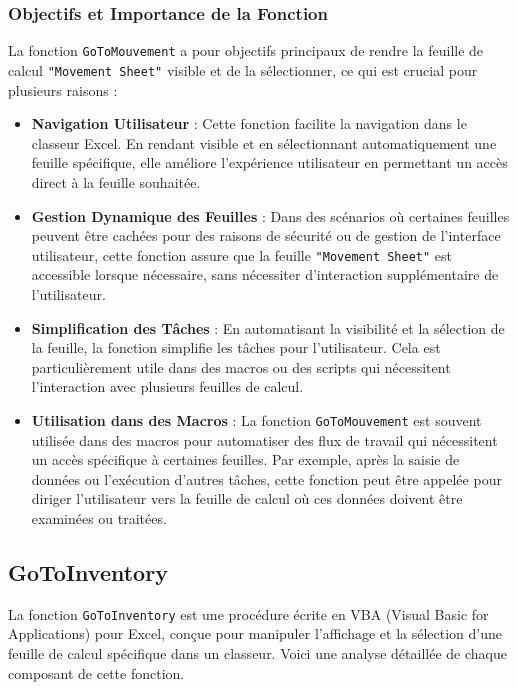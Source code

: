 \documentclass[a4paper, oneside, 12pt, final]{extreport}
\begin{document}
\subsubsection{Objectifs et Importance de la Fonction}

La fonction \texttt{GoToMouvement} a pour objectifs principaux de rendre la feuille de calcul \texttt{"Movement Sheet"} visible et de la sélectionner, ce qui est crucial pour plusieurs raisons :

\begin{itemize}
    \item \textbf{Navigation Utilisateur} : Cette fonction facilite la navigation dans le classeur Excel. En rendant visible et en sélectionnant automatiquement une feuille spécifique, elle améliore l'expérience utilisateur en permettant un accès direct à la feuille souhaitée.
    \item \textbf{Gestion Dynamique des Feuilles} : Dans des scénarios où certaines feuilles peuvent être cachées pour des raisons de sécurité ou de gestion de l'interface utilisateur, cette fonction assure que la feuille \texttt{"Movement Sheet"} est accessible lorsque nécessaire, sans nécessiter d'interaction supplémentaire de l'utilisateur.
    \item \textbf{Simplification des Tâches} : En automatisant la visibilité et la sélection de la feuille, la fonction simplifie les tâches pour l'utilisateur. Cela est particulièrement utile dans des macros ou des scripts qui nécessitent l'interaction avec plusieurs feuilles de calcul.
    \item \textbf{Utilisation dans des Macros} : La fonction \texttt{GoToMouvement} est souvent utilisée dans des macros pour automatiser des flux de travail qui nécessitent un accès spécifique à certaines feuilles. Par exemple, après la saisie de données ou l'exécution d'autres tâches, cette fonction peut être appelée pour diriger l'utilisateur vers la feuille de calcul où ces données doivent être examinées ou traitées.
\end{itemize}
\subsection{GoToInventory}

La fonction \texttt{GoToInventory} est une procédure écrite en VBA (Visual Basic for Applications) pour Excel, conçue pour manipuler l'affichage et la sélection d'une feuille de calcul spécifique dans un classeur. Voici une analyse détaillée de chaque composant de cette fonction.
\end{document}
